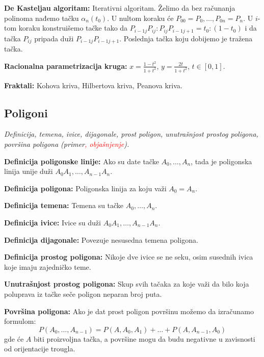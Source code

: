 \documentclass[12pt]{article}
\newcommand{\ocena}[1]{\textcolor{red}{#1}}
\begin{document}
\textbf{De Kasteljau algoritam:} Iterativni algoritam. Želimo da bez računanja
polinoma nađemo tačku $\alpha_n(t_0)$. U nultom koraku će
$P_{00}=P_0,\dotsc,P_{0n}=P_n$. U $i$-tom koraku konstruišemo tačke tako da
$P_{i-1j}P_{ij}:P_{ij}P_{i-1j+1}=t_0:(1-t_0)$ i da tačka $P_{ij}$ pripada duži
$P_{i-1j}P_{i-1j+1}$. Poslednja tačka koju dobijemo je tražena tačka.
\par

\textbf{Racionalna parametrizacija kruga:} $x=\frac{1-t^2}{1+t^2}$,
$y=\frac{2t}{1+t^2}$, $t\in[0,1]$.
\par

\textbf{Fraktali:} Kohova kriva, Hilbertova kriva, Peanova kriva.

\subsection{Poligoni}
\textit{Definicija, temena, ivice, dijagonale, prost poligon, unutrašnjost
    prostog poligona, površina poligona (primer\ocena{, objašnjenje}).}
\par
\vspace*{1cm}

\textbf{Definicija poligonske linije:} Ako su date tačke $A_0,\dotsc,A_n$, tada
je poligonska linija unije duži $A_0A_1,\dotsc,A_{n-1}A_n$.
\par

\textbf{Definicija poligona:} Poligonska linija za koju važi $A_0=A_n$.
\par

\textbf{Definicija temena:} Temena su tačke $A_0,\dotsc,A_n$.
\par

\textbf{Definicija ivice:} Ivice su duži $A_0A_1,\dotsc,A_{n-1}A_n$.
\par

\textbf{Definicija dijagonale:} Povezuje nesusedna temena poligona.
\par

\textbf{Definicija prostog poligona:} Nikoje dve ivice se ne seku, osim
susednih ivica koje imaju zajedničko teme.
\par

\textbf{Unutrašnjost prostog poligona:} Skup svih tačaka za koje važi da
bilo koja poluprava iz tačke seče poligon neparan broj puta.
\par

\textbf{Površina poligona:} Ako je dat prost poligon površinu možemo da
izračunamo formulom:
$$P(A_0,\dotsc,A_{n-1})=P(A,A_0,A_1)+\dotsc+P(A,A_{n-1},A_0)$$
gde će $A$ biti proizvoljna tačka, a površine mogu da budu negativne u
zavisnosti od orijentacije trougla.
\end{document}
